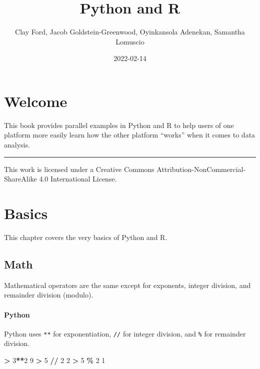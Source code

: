 \documentclass[
]{book}
\title{Python and R}
\author{Clay Ford, Jacob Goldstein-Greenwood, Oyinkansola Adenekan, Samantha Lomuscio}
\date{2022-02-14}
\newenvironment{Shaded}{\begin{snugshade}}{\end{snugshade}}
\newcommand{\DecValTok}[1]{\textcolor[rgb]{0.00,0.00,0.81}{#1}}
\newcommand{\OperatorTok}[1]{\textcolor[rgb]{0.81,0.36,0.00}{\textbf{#1}}}
\begin{document}
\maketitle

{
\setcounter{tocdepth}{1}
\tableofcontents
}
\hypertarget{welcome}{%
\chapter*{Welcome}\label{welcome}}

This book provides parallel examples in Python and R to help users of one platform more easily learn how the other platform ``works'' when it comes to data analysis.

\begin{center}\rule{0.5\linewidth}{0.5pt}\end{center}

This work is licensed under a Creative Commons Attribution-NonCommercial-ShareAlike 4.0 International License.

\hypertarget{basics}{%
\chapter{Basics}\label{basics}}

This chapter covers the very basics of Python and R.

\hypertarget{math}{%
\section{Math}\label{math}}

Mathematical operators are the same except for exponents, integer division, and remainder division (modulo).

\hypertarget{python}{%
\subsubsection*{Python}\label{python}}

Python uses \texttt{**} for exponentiation, \texttt{//} for integer division, and \texttt{\%} for remainder division.

\begin{Shaded}
\begin{Highlighting}[]
\OperatorTok{\textgreater{}} \DecValTok{3}\OperatorTok{**}\DecValTok{2}
\DecValTok{9}
\OperatorTok{\textgreater{}} \DecValTok{5} \OperatorTok{//} \DecValTok{2}
\DecValTok{2}
\OperatorTok{\textgreater{}} \DecValTok{5} \OperatorTok{\%} \DecValTok{2}
\DecValTok{1}
\end{Highlighting}
\end{Shaded}
\end{document}
